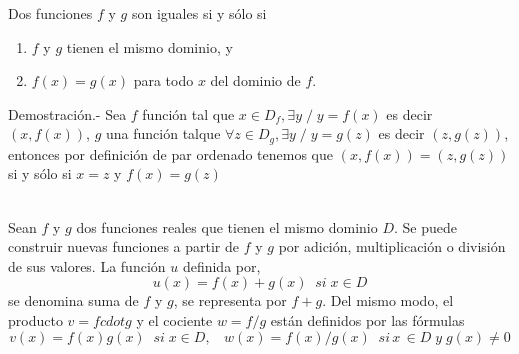         \begin{teo}
            Dos funciones $f$ y $g$ son iguales si y sólo si 
            \begin{enumerate}[\bfseries (a)]
                \item $f$ y $g$ tienen el mismo dominio, y
                \item $f(x) = g(x)$ para todo $x$ del dominio de $f.$\\
            \end{enumerate}
            Demostración.- \; Sea $f$ función tal que $x \in  D_f,\exists y \; / \; y=f(x)$ es decir $(x,f(x))$, $g$ una función talque $\forall  z \in  D_g , \exists  y \; / \; y=g(z)$ es decir $(z,g(z))$, entonces por definición de par ordenado tenemos que $(x,f(x)) = (z,g(z)) $ si y sólo si $x=z$ y $f(x)=g(z)$\\\\
        \end{teo}

    \begin{tcolorbox}[colframe=white]
        \begin{def.}
            Sean $f$ y $g$ dos funciones reales que tienen el mismo dominio $D$. Se puede construir nuevas funciones a partir de $f$ y $g$ por adición, multiplicación o división de sus valores. La función $u$ definida por,
            $$u(x) = f(x) + g(x) \; \; si \; x \in D$$
            se denomina suma de $f$ y $g$, se representa por $f+g.$ Del mismo modo, el producto $v=f cdot g$ y el cociente $w=f/g$ están definidos por las fórmulas
            $$v(x) = f(x) g(x) \; \; si \; x \in D, \; \; \, \, w(x) = f(x)/g(x) \; \; si \, x \, \in D \; y \; g(x) \neq 0$$
        \end{def.}
    \end{tcolorbox}
    
\setcounter{section}{4}
